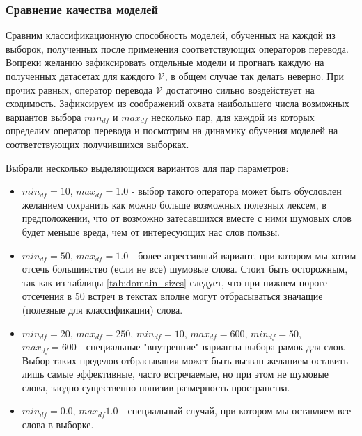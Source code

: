 \documentclass{article}
\begin{document}
    \subsubsection{Сравнение качества моделей}
    
        Сравним классификационную способность моделей, обученных на каждой из выборок, полученных после применения соответствующих операторов перевода. Вопреки желанию зафиксировать отдельные модели и прогнать каждую на полученных датасетах для каждого $\mathcal{V}$, в общем случае так делать неверно. При прочих равных, оператор перевода $\mathcal{V}$ достаточно сильно воздействует на сходимость. Зафиксируем из соображений охвата наибольшего числа возможных вариантов выбора ${min}_{df}$ и ${max}_{df}$ несколько пар, для каждой из которых определим оператор перевода и посмотрим на динамику обучения моделей на соответствующих получившихся выборках.

        \begin{leftrule}
            Выбрали несколько выделяющихся вариантов для пар параметров:
            \begin{itemize}
                \item ${min}_{df}=10$, ${max}_{df}=1.0$ - выбор такого оператора может быть обусловлен желанием сохранить как можно больше возможных полезных лексем, в предположении, что от возможно затесавшихся вместе с ними шумовых слов будет меньше вреда, чем от интересующих нас слов пользы.
                \item ${min}_{df}=50$, ${max}_{df}=1.0$ - более агрессивный вариант, при котором мы хотим отсечь большинство (если не все) шумовые слова. Стоит быть осторожным, так как из таблицы \ref{tab:domain_sizes} следует, что при нижнем пороге отсечения в 50 встреч в текстах вполне могут отбрасываться значащие (полезные для классификации) слова.
                \item ${min}_{df}=20$, ${max}_{df}=250$, ${min}_{df}=10$, ${max}_{df}=600$, ${min}_{df}=50$, ${max}_{df}=600$ - специальные "внутренние" варианты выбора рамок для слов. Выбор таких пределов отбрасывания может быть вызван желанием оставить лишь самые эффективные, часто встречаемые, но при этом не шумовые слова, заодно существенно понизив размерность пространства.
                \item  ${min}_{df}=0.0$, ${max}_{df}1.0$ - специальный случай, при котором мы оставляем все слова в выборке.
            \end{itemize}
        \end{leftrule}
\end{document}
